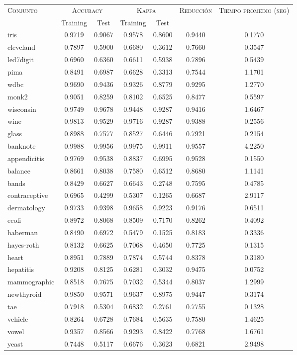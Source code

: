 \begin{table}[]
\centering
\begin{tabular}{l c c c c c c}
\hline
\multirow{2}{*}{\textsc{Conjunto}}
	& \multicolumn{2}{c}{\textsc{Accuracy}}
	& \multicolumn{2}{c}{\textsc{Kappa}}
	& \textsc{Reducción}
	& \textsc{Tiempo promedio (seg)} \\
	& Training & Test
	& Training & Test \\ 
\hline
\hline

iris & 0.9719 & 0.9067 & 0.9578 & 0.8600 & 0.9440 & 0.1770 \\
cleveland & 0.7897 & 0.5900 & 0.6680 & 0.3612 & 0.7660 & 0.3547 \\
led7digit & 0.6960 & 0.6360 & 0.6611 & 0.5938 & 0.7896 & 0.5439 \\
pima & 0.8491 & 0.6987 & 0.6628 & 0.3313 & 0.7544 & 1.1701 \\
wdbc & 0.9690 & 0.9436 & 0.9326 & 0.8779 & 0.9295 & 1.2770 \\
monk2 & 0.9051 & 0.8259 & 0.8102 & 0.6525 & 0.8477 & 0.5597 \\
wisconsin & 0.9749 & 0.9678 & 0.9448 & 0.9287 & 0.9416 & 1.6467 \\
wine & 0.9813 & 0.9529 & 0.9716 & 0.9287 & 0.9388 & 0.2556 \\
glass & 0.8988 & 0.7577 & 0.8527 & 0.6446 & 0.7921 & 0.2154 \\
banknote & 0.9988 & 0.9956 & 0.9975 & 0.9911 & 0.9557 & 4.2250 \\
appendicitis & 0.9769 & 0.9538 & 0.8837 & 0.6995 & 0.9528 & 0.1550 \\
balance & 0.8661 & 0.8038 & 0.7580 & 0.6512 & 0.8680 & 1.1141 \\
bands & 0.8429 & 0.6627 & 0.6643 & 0.2748 & 0.7595 & 0.4785 \\
contraceptive & 0.6965 & 0.4299 & 0.5307 & 0.1265 & 0.6687 & 2.9117 \\
dermatology & 0.9733 & 0.9398 & 0.9658 & 0.9223 & 0.9176 & 0.6511 \\
ecoli & 0.8972 & 0.8068 & 0.8509 & 0.7170 & 0.8262 & 0.4092 \\
haberman & 0.8490 & 0.6972 & 0.5479 & 0.1525 & 0.8183 & 0.3336 \\
hayes-roth & 0.8132 & 0.6625 & 0.7068 & 0.4650 & 0.7725 & 0.1315 \\
heart & 0.8951 & 0.7889 & 0.7874 & 0.5744 & 0.8378 & 0.3180 \\
hepatitis & 0.9208 & 0.8125 & 0.6281 & 0.3032 & 0.9475 & 0.0752 \\
mammographic & 0.8518 & 0.7675 & 0.7032 & 0.5344 & 0.8037 & 1.2999 \\
newthyroid & 0.9850 & 0.9571 & 0.9637 & 0.8975 & 0.9447 & 0.3174 \\
tae & 0.7918 & 0.5304 & 0.6832 & 0.2761 & 0.7755 & 0.1328 \\
vehicle & 0.8264 & 0.6728 & 0.7684 & 0.5635 & 0.7580 & 1.4625 \\
vowel & 0.9357 & 0.8566 & 0.9293 & 0.8422 & 0.7768 & 1.6761 \\
yeast & 0.7448 & 0.5117 & 0.6676 & 0.3623 & 0.6821 & 2.9498 \\


\end{tabular}
\end{table}
